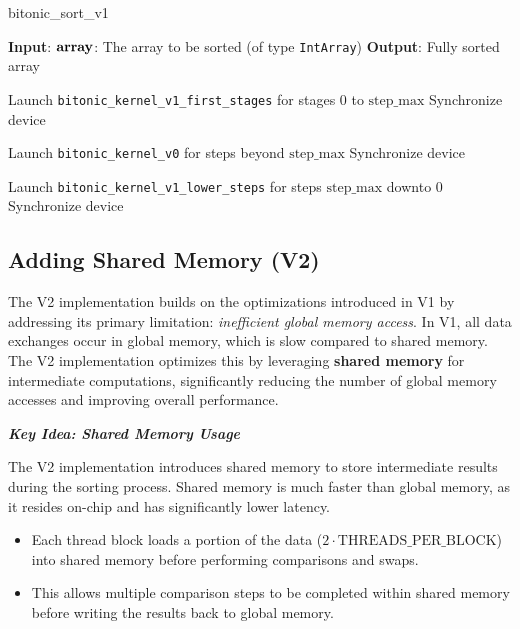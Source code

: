 \documentclass[12pt]{article}
\begin{document}
\begin{algorithm}[H]
\caption{bitonic\_sort\_v1}\label{alg:bitonic_sort_v1}
\begin{algorithmic}[1]
\Require \textbf{Input}: 
    \( \text{\textbf{array}} \): The array to be sorted (of type \texttt{IntArray})
\Ensure \textbf{Output}: Fully sorted array

\State Launch \texttt{bitonic\_kernel\_v1\_first\_stages} for stages \( 0 \) to \( \text{step\_max} \)
\State Synchronize device 

        \State Launch \texttt{bitonic\_kernel\_v0} for steps beyond \( \text{step\_max} \)
        \State Synchronize device 
    \EndFor

    \State Launch \texttt{bitonic\_kernel\_v1\_lower\_steps} for steps \( \text{step\_max} \) downto \( 0 \)
    \State Synchronize device 
\EndFor

\end{algorithmic}
\end{algorithm}


\subsection{Adding Shared Memory (V2)}

The V2 implementation builds on the optimizations introduced in V1 by addressing its primary limitation: \textit{inefficient global memory access}. In V1, all data exchanges occur in global memory, which is slow compared to shared memory. The V2 implementation optimizes this by leveraging \textbf{shared memory} for intermediate computations, significantly reducing the number of global memory accesses and improving overall performance.

\vspace{+5pt}

\textit{\textbf{Key Idea: Shared Memory Usage}}

The V2 implementation introduces shared memory to store intermediate results during the sorting process. Shared memory is much faster than global memory, as it resides on-chip and has significantly lower latency.

\begin{itemize}[nosep]
    \item Each thread block loads a portion of the data (\( 2 \cdot \text{THREADS\_PER\_BLOCK} \)) into shared memory before performing comparisons and swaps.
    \item This allows multiple comparison steps to be completed within shared memory before writing the results back to global memory.
\end{itemize}
\end{document}
